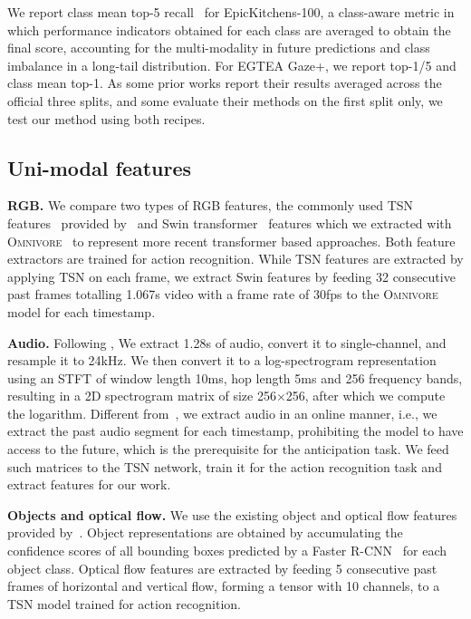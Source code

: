 \documentclass[10pt,twocolumn,letterpaper,dvipsnames]{article}
\begin{document}
We report class mean top-5 recall~\cite{furnariLeveragingUncertaintyRethink2018} for EpicKitchens-100, a class-aware metric in which performance indicators obtained for each class are averaged to obtain the final score, accounting for the multi-modality in future predictions and class imbalance in a long-tail distribution. For EGTEA Gaze+, we report top-1/5 and class mean top-1. As some prior works report their results averaged across the official three splits, and some evaluate their methods on the first split only, we test our method using both recipes.

\subsection{Uni-modal features}
\label{sec:feature-extraction}
\noindent\textbf{RGB.} We compare two types of RGB features, the commonly used TSN features~\cite{wangTemporalSegmentNetworks2016} provided by~\cite{furnariWhatWouldYou2019} and Swin transformer~\cite{liu2021swin} features which we extracted with \textsc{Omnivore}~\cite{girdharOmnivoreSingleModel2022} to represent more recent transformer based approaches. Both feature extractors are trained for action recognition. While TSN features are extracted by applying TSN on each frame, we extract Swin features by feeding 32 consecutive past frames totalling 1.067s video with a frame rate of 30fps to the \textsc{Omnivore} model for each timestamp.

\noindent\textbf{Audio.} Following \cite{kazakosEPICFusionAudioVisualTemporal2019}, We extract 1.28s of audio, convert it to single-channel, and resample it to 24kHz. We then convert it to a log-spectrogram representation using an STFT of window length 10ms, hop length 5ms and 256 frequency bands, resulting in a 2D spectrogram matrix of size 256$\times$256, after which we compute the logarithm. Different from~\cite{kazakosEPICFusionAudioVisualTemporal2019}, we extract audio in an online manner, i.e., we extract the past audio segment for each timestamp, prohibiting the model to have access to the future, which is the prerequisite for the anticipation task. We feed such matrices to the TSN network, train it for the action recognition task and extract features for our work.

\noindent\textbf{Objects and optical flow.} We use the existing object and optical flow features provided by~\cite{furnariWhatWouldYou2019}. Object representations are obtained by accumulating the confidence scores of all bounding boxes predicted by a Faster R-CNN~\cite{ren2015faster} for each object class. Optical flow features are extracted by feeding 5 consecutive past frames of horizontal and vertical flow, forming a tensor with 10 channels, to a TSN model trained for action recognition.
\end{document}
